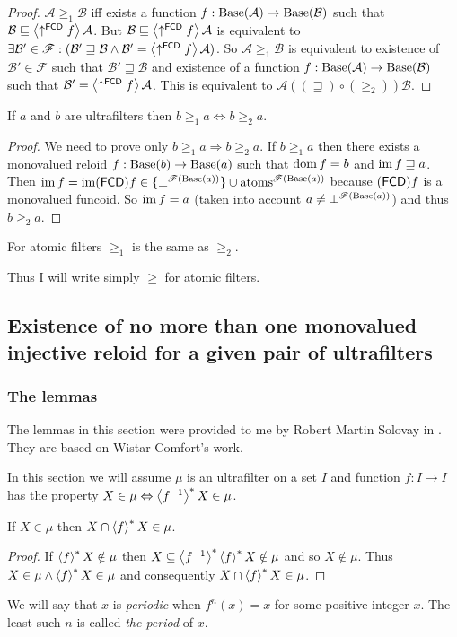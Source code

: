 \begin{proof}
$\mathcal{A}\ge_{1}\mathcal{B}$ iff exists a function $f:\operatorname{Base}(\mathcal{A})\rightarrow\operatorname{Base}(\mathcal{B})$
such that $\mathcal{B}\sqsubseteq\left\langle \uparrow^{\mathsf{FCD}}f\right\rangle\mathcal{A}$.
But $\mathcal{B}\sqsubseteq\left\langle \uparrow^{\mathsf{FCD}}f\right\rangle\mathcal{A}$
is equivalent to $\exists\mathcal{B}'\in\mathscr{F}:(\mathcal{B}'\sqsupseteq\mathcal{B}\land\mathcal{B}'=\left\langle \uparrow^{\mathsf{FCD}}f\right\rangle\mathcal{A})$.
So $\mathcal{A}\ge_{1}\mathcal{B}$ is equivalent to existence of
$\mathcal{B}'\in\mathscr{F}$ such that $\mathcal{B}'\sqsupseteq\mathcal{B}$
and existence of a function $f:\operatorname{Base}(\mathcal{A})\rightarrow\operatorname{Base}(\mathcal{B})$
such that $\mathcal{B}'=\left\langle \uparrow^{\mathsf{FCD}}f\right\rangle\mathcal{A}$.
This is equivalent to $\mathcal{A}\mathrel{((\sqsupseteq)\circ(\ge_{2}))}\mathcal{B}$.\end{proof}
\begin{prop}
If $a$ and $b$ are ultrafilters then $b\ge_{1}a\Leftrightarrow b\ge_{2}a$.\end{prop}
\begin{proof}
We need to prove only $b\ge_{1}a\Rightarrow b\ge_{2}a$. If $b\ge_{1}a$
then there exists a monovalued reloid $f:\operatorname{Base}(b)\rightarrow\operatorname{Base}(a)$
such that $\operatorname{dom} f=b$ and $\operatorname{im} f\sqsupseteq a$. Then $\operatorname{im} f=\operatorname{im}(\mathsf{FCD}) f\in\{\bot^{\mathscr{F}(\operatorname{Base}(a))}\}\cup\operatorname{atoms}^{\mathscr{F}(\operatorname{Base}(a))}$
because $(\mathsf{FCD}) f$ is a monovalued funcoid. So $\operatorname{im} f=a$ (taken
into account $a\ne\bot^{\mathscr{F}(\operatorname{Base}(a))}$) and thus $b\ge_{2}a$\@.\end{proof}
\begin{cor}
For atomic filters $\ge_{1}$ is the same as $\ge_{2}$.
\end{cor}
Thus I will write simply $\ge$ for atomic filters.


\subsection{Existence of no more than one monovalued injective reloid for a given
pair of ultrafilters}


\subsubsection{The lemmas}

The lemmas in this section were provided to me by Robert Martin Solovay
in \cite{solovay-on-identity}. They are based on Wistar Comfort's
work.

In this section we will assume $\mu$ is an ultrafilter on a set $I$
and function $f:I\rightarrow I$ has the property $X\in\mu\Leftrightarrow\left\langle f^{-1}\right\rangle ^{\ast}X\in\mu$.
\begin{lem}
\label{lem:one-reloid-first}If $X\in\mu$ then $X\cap\left\langle f\right\rangle ^{\ast}X\in\mu$.\end{lem}
\begin{proof}
If $\left\langle f\right\rangle ^{\ast}X\notin\mu$ then $X\subseteq\left\langle f^{-1}\right\rangle ^{\ast}\left\langle f\right\rangle ^{\ast}X\notin\mu$
and so $X\notin\mu$. Thus $X\in\mu\land\left\langle f\right\rangle ^{\ast}X\in\mu$ and consequently
$X\cap\left\langle f\right\rangle ^{\ast}X\in\mu$.
\end{proof}
We will say that $x$ is \emph{periodic} when $f^{n}(x)=x$ for some
positive integer $x$. The least such $n$ is called \emph{the period}
of $x$.

